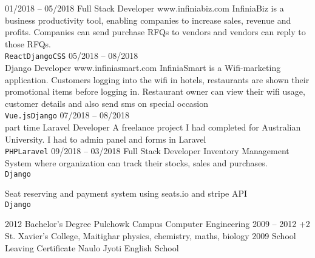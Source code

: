 \documentclass[9pt]{developercv} %
\begin{document}
\begin{entrylist}
	\entry
		{01/2018 -- 05/2018}
		{Full Stack Developer}
		{www.infiniabiz.com}
    		{
    InfiniaBiz is a business productivity tool, enabling companies to increase sales, revenue and profits. Companies can send purchase RFQs to vendors and vendors can reply to those RFQs.\\ 
    		    \texttt{React}\slashsep{}\slashsep\texttt{Django}\slashsep\texttt{CSS}\slashsep{}\slashsep{}\slashsep{}}
	\entry
		{05/2018 -- 08/2018\\\footnotesize{}}
		{Django Developer}
		{www.infiniasmart.com}
		{
		    InfiniaSmart is a Wifi-marketing application. Customers logging into the wifi in hotels, restaurants are shown their promotional items before logging in. Restaurant owner can view their wifi usage, customer details and also send sms on special occasion\\
		    \texttt{Vue.js}\slashsep\texttt{Django}\slashsep{}\slashsep{}\slashsep{}
		}
	\entry
		{07/2018 -- 08/2018\\\footnotesize{part time}}
		{Laravel Developer}
		{}
		{
		   A freelance project I had completed for Australian University. I had to admin panel and forms in Laravel\\ \texttt{PHP}\slashsep\texttt{Laravel}
		}
	\entry
	    {09/2018 -- 03/2018}
	    {Full Stack Developer}
	    {}
	    {
	        Inventory Management System where organization can track their stocks, sales and purchases.\\
	        \texttt{Django}\slashsep{}\slashsep{}\slashsep{}
	    }
	    
	    {Seat reserving and payment system using seats.io and stripe API\\
	        \texttt{Django}\slashsep{}\slashsep{}\slashsep{}
	    }
\end{entrylist}



\begin{entrylist}
	\entry
		{2012}
		{Bachelor's Degree}
		{Pulchowk Campus}
	    {Computer Engineering}
	\entry
		{2009 -- 2012}
		{+2}
		{St. Xavier's College, Maitighar}
		{physics, chemistry, maths, biology}
	\entry
		{2009}
		{School Leaving Certificate}
		{Naulo Jyoti English School}
		{}
\end{entrylist}
\end{document}
